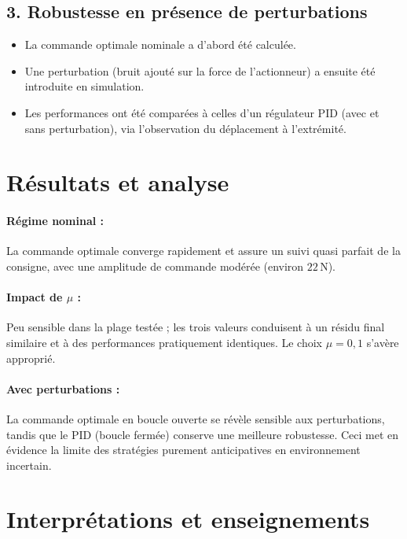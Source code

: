 \documentclass[12pt,a4paper]{article}
\begin{document}
\subsection{3. Robustesse en présence de perturbations}
\begin{itemize}
    \item La commande optimale nominale a d'abord été calculée.
    \item Une perturbation (bruit ajouté sur la force de l'actionneur) a ensuite été introduite en simulation.
    \item Les performances ont été comparées à celles d'un régulateur PID (avec et sans perturbation), via l'observation du déplacement à l'extrémité.
\end{itemize}

\section*{Résultats et analyse}

\paragraph{Régime nominal :}
La commande optimale converge rapidement et assure un suivi quasi parfait de la consigne, avec une amplitude de commande modérée (environ \( 22 \, \text{N} \)).

\paragraph{Impact de \( \mu \) :}
Peu sensible dans la plage testée ; les trois valeurs conduisent à un résidu final similaire et à des performances pratiquement identiques. Le choix \( \mu = 0,1 \) s'avère approprié.

\paragraph{Avec perturbations :}
La commande optimale en boucle ouverte se révèle sensible aux perturbations, tandis que le PID (boucle fermée) conserve une meilleure robustesse. Ceci met en évidence la limite des stratégies purement anticipatives en environnement incertain.

\section*{Interprétations et enseignements}
\end{document}
